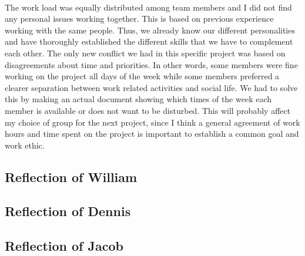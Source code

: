 \\
The work load was equally distributed among team members and I did not find any personal issues working together. This is based on previous experience working with the same people. Thus, we already know our different personalities and have thoroughly established the different skills that we have to complement each other. The only new conflict we had in this specific project was based on disagreements about time and priorities. In other words, some members were fine working on the project all days of the week while some members preferred a clearer separation between work related activities and social life. We had to solve this by making an actual document showing which times of the week each member is available or does not want to be disturbed. This will probably affect my choice of group for the next project, since I think a general agreement of work hours and time spent on the project is important to establish a common goal and work ethic. 

\subsection{Reflection of William}
\subsection{Reflection of Dennis}
\subsection{Reflection of Jacob}